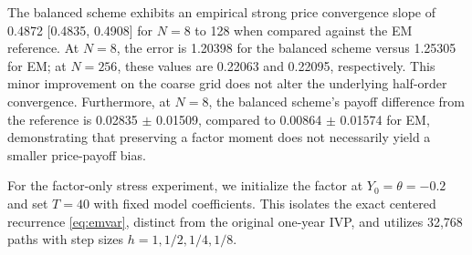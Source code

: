 The balanced scheme exhibits an empirical strong price convergence slope of 0.4872 [0.4835, 0.4908] for $N=8$ to 128 when compared against the EM reference. At $N=8$, the error is 1.20398 for the balanced scheme versus 1.25305 for EM; at $N=256$, these values are 0.22063 and 0.22095, respectively. This minor improvement on the coarse grid does not alter the underlying half-order convergence. Furthermore, at $N=8$, the balanced scheme's payoff difference from the reference is 0.02835 $\pm$ 0.01509, compared to 0.00864 $\pm$ 0.01574 for EM, demonstrating that preserving a factor moment does not necessarily yield a smaller price-payoff bias.

For the factor-only stress experiment, we initialize the factor at $Y_0=\theta=-0.2$ and set $T=40$ with fixed model coefficients. This isolates the exact centered recurrence \eqref{eq:emvar}, distinct from the original one-year IVP, and utilizes 32,768 paths with step sizes $h=1,1/2,1/4,1/8$.

